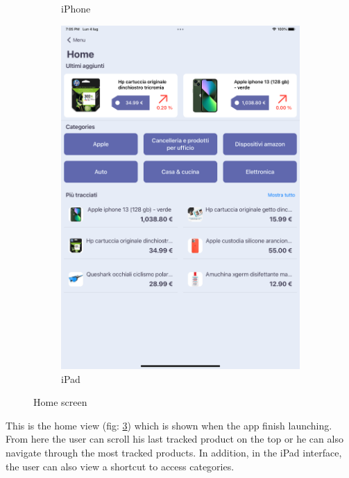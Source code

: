 \begin{figure}[h!]
\begin{subfigure}[b]{0.3\textwidth}
            \caption{iPhone}
            \label{fig:home_screen_iphone}
        \end{subfigure}
        \begin{subfigure}[b]{0.45\textwidth}
            \centering
            \includegraphics[width=\textwidth]{images/interfaces/home_screen_ipad.png}
            \caption{iPad}
            \label{fig:home_screen_ipad}
        \end{subfigure}
         \caption{Home screen}
        \label{fig:home_screen}
\end{figure}
\FloatBarrier
This is the home view (fig: \ref{fig:home_screen}) which is shown when the app finish launching. From here the user can scroll his last tracked product on the top or he can also navigate through the most tracked products. In addition, in the iPad interface, the user can also view a shortcut to access categories.

